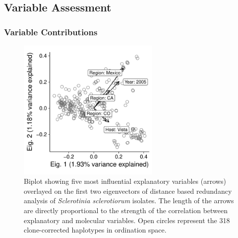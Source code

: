 \documentclass[fleqn,10pt,lineno]{wlpeerj} %
\theoremstyle{definition}
\theoremstyle{definition}
\theoremstyle{definition}
\theoremstyle{remark}
\begin{document}
\subsection*{Variable Assessment}\label{variable-assessment}

\subsubsection*{Variable Contributions}\label{variable-contributions}

\begin{figure}
\centering
\includegraphics[width=0.61000\textwidth]{../../results/figures/publication/Figure7Z.pdf}
\caption{Biplot showing five most influential explanatory variables
(arrows) overlayed on the first two eigenvectors of distance based
redundancy analysis of \emph{Sclerotinia sclerotiorum} isolates. The
length of the arrows are directly proportional to the strength of the
correlation between explanatory and molecular variables. Open circles
represent the 318 clone-corrected haplotypes in ordination
space.}\label{rda-biplot}
\end{figure}
\end{document}
